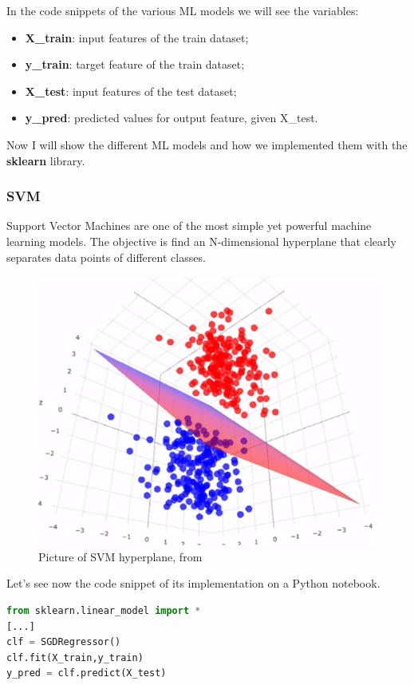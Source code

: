In the code snippets of the various ML models we will see the variables:
\begin{itemize}
    \item \textbf{X\_train}: input features of the train dataset;
    \item \textbf{y\_train}: target feature of the train dataset;
    \item \textbf{X\_test}: input features of the test dataset;
    \item \textbf{y\_pred}: predicted values for output feature, given X\_test.
\end{itemize}

Now I will show the different ML models and how we implemented them with the \textbf{sklearn} library.

\subsubsection{SVM}
Support Vector Machines are one of the most simple yet powerful machine learning models. The objective is find an N-dimensional hyperplane that clearly separates data points of different classes.

\begin{figure}
    \centering
    \includegraphics[scale=0.6]{res/ML/svm.png}
    \caption{Picture of SVM hyperplane, from \cite{mediumSvm}}
\end{figure}

Let's see now the code snippet of its implementation on a Python notebook.

\begin{lstlisting}[language=Python, caption=SVM implementation]
from sklearn.linear_model import *
[...]
clf = SGDRegressor()
clf.fit(X_train,y_train)
y_pred = clf.predict(X_test)
\end{lstlisting}

